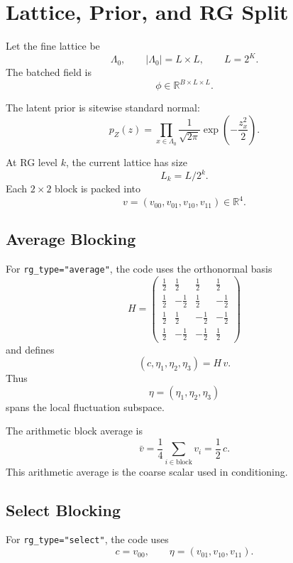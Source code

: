 \documentclass[11pt]{article}
\begin{document}
\section{Lattice, Prior, and RG Split}

Let the fine lattice be
\[
\Lambda_0,\qquad |\Lambda_0| = L\times L,\qquad L=2^K.
\]
The batched field is
\[
\phi \in \mathbb{R}^{B\times L\times L}.
\]

The latent prior is sitewise standard normal:
\begin{equation}
p_Z(z)=\prod_{x\in\Lambda_0}\frac{1}{\sqrt{2\pi}}
\exp\!\left(-\frac{z_x^2}{2}\right).
\end{equation}

At RG level $k$, the current lattice has size
\[
L_k = L/2^k.
\]
Each $2\times 2$ block is packed into
\[
v=(v_{00},v_{01},v_{10},v_{11})\in\mathbb{R}^4.
\]

\subsection{Average Blocking}

For \texttt{rg\_type="average"}, the code uses the orthonormal basis
\begin{equation}
H=
\begin{pmatrix}
\tfrac12 & \tfrac12 & \tfrac12 & \tfrac12 \\
\tfrac12 & -\tfrac12 & \tfrac12 & -\tfrac12 \\
\tfrac12 & \tfrac12 & -\tfrac12 & -\tfrac12 \\
\tfrac12 & -\tfrac12 & -\tfrac12 & \tfrac12
\end{pmatrix}
\end{equation}
and defines
\begin{equation}
(c,\eta_1,\eta_2,\eta_3)=H\,v.
\end{equation}
Thus
\[
\eta=(\eta_1,\eta_2,\eta_3)
\]
spans the local fluctuation subspace.

The arithmetic block average is
\[
\bar v = \frac14\sum_{i\in\mathrm{block}} v_i = \frac12\,c.
\]
This arithmetic average is the coarse scalar used in conditioning.

\subsection{Select Blocking}

For \texttt{rg\_type="select"}, the code uses
\begin{equation}
c=v_{00},\qquad \eta=(v_{01},v_{10},v_{11}).
\end{equation}
\end{document}
